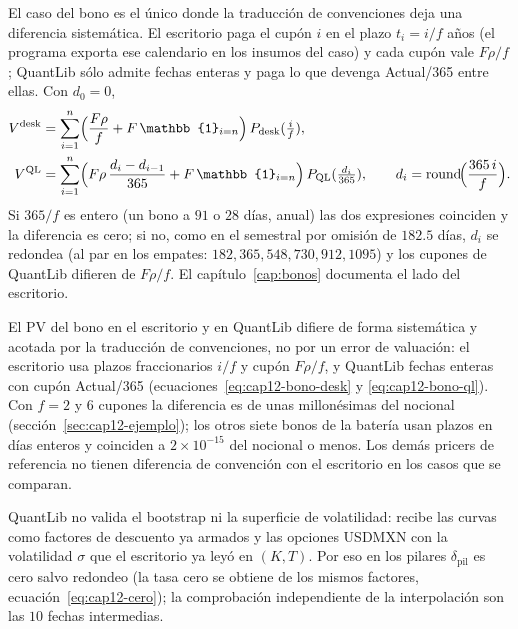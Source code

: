 El caso del bono es el único donde la traducción de convenciones deja una diferencia sistemática. El escritorio paga el
cupón $i$ en el plazo $t_i = i/f$ años (el programa exporta ese calendario en los insumos del caso) y cada cupón vale
$F\rho/f$; QuantLib sólo admite fechas enteras y paga lo que devenga Actual/365 entre ellas. Con $d_0 = 0$,
\begin{align}
  V^{\mathrm{desk}} &= \sum_{i=1}^{n} \Bigl(\frac{F\rho}{f} + F\,\mathbb{1}_{i = n}\Bigr)\,\DF{\mathrm{desk}}{\tfrac{i}{f}}, \label{eq:cap12-bono-desk}\\
  V^{\mathrm{QL}} &= \sum_{i=1}^{n} \Bigl(F\rho\,\frac{d_i - d_{i-1}}{365} + F\,\mathbb{1}_{i = n}\Bigr)\,\DF{\mathrm{QL}}{\tfrac{d_i}{365}},
  \qquad d_i = \operatorname{round}\!\Bigl(\frac{365\,i}{f}\Bigr). \label{eq:cap12-bono-ql}
\end{align}
Si $365/f$ es entero (un bono a $91$ o $28$ días, anual) las dos expresiones coinciden y la diferencia es cero; si
no, como en el semestral por omisión de $182.5$ días, $d_i$ se redondea (al par en los empates:
$182, 365, 548, 730, 912, 1095$) y los cupones de QuantLib difieren de $F\rho/f$. El capítulo~\ref{cap:bonos}
documenta el lado del escritorio.

\begin{diferencia}
  El PV del bono en el escritorio y en QuantLib difiere de forma sistemática y acotada por la traducción de
  convenciones, no por un error de valuación: el escritorio usa plazos fraccionarios $i/f$ y cupón $F\rho/f$, y
  QuantLib fechas enteras con cupón Actual/365 (ecuaciones~\eqref{eq:cap12-bono-desk} y \eqref{eq:cap12-bono-ql}). Con
  $f = 2$ y $6$ cupones la diferencia es de unas millonésimas del nocional (sección~\ref{sec:cap12-ejemplo}); los otros siete
  bonos de la batería usan plazos en días enteros y coinciden a $2\times 10^{-15}$ del nocional o menos. Los demás pricers de referencia no tienen diferencia de
  convención con el escritorio en los casos que se comparan.
\end{diferencia}

\begin{diferencia}
  QuantLib no valida el bootstrap ni la superficie de volatilidad: recibe las curvas como factores de descuento ya
  armados y las opciones USDMXN con la volatilidad $\sigma$ que el escritorio ya leyó en $(K, T)$. Por eso en los
  pilares $\delta_{\mathrm{pil}}$ es cero salvo redondeo (la tasa cero se obtiene de los mismos factores,
  ecuación~\eqref{eq:cap12-cero}); la comprobación independiente de la interpolación son las $10$ fechas intermedias.
\end{diferencia}

